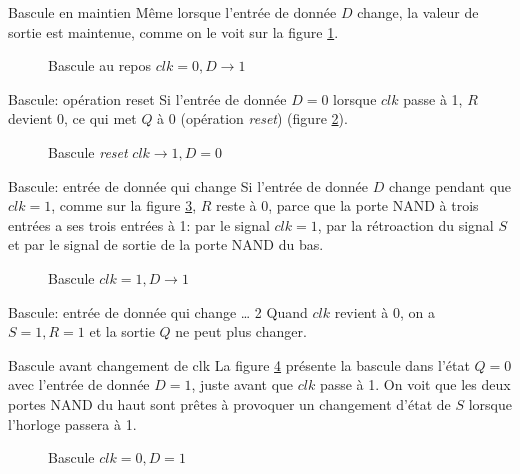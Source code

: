 \documentclass[presentation]{beamer}
\begin{document}
\begin{frame}[label={sec:orgb5165db}]{Bascule en maintien}
Même lorsque l'entrée de donnée \(D\) change, la valeur de sortie est
maintenue, comme on le voit sur la figure \ref{fig:org60880c1}.

\begin{figure}[htbp]
\centering

\caption{\label{fig:org60880c1}Bascule au repos  \(clk = 0, D \rightarrow 1\)}
\end{figure}
\end{frame}

\begin{frame}[label={sec:org6b2a0d5}]{Bascule: opération reset}
Si l'entrée de donnée \(D = 0\) lorsque \(clk\) passe à 1, \(R\)
devient 0, ce qui met \(Q\) à 0 (opération \emph{reset}) (figure
\ref{fig:org07d2ee8}).

\begin{figure}[htbp]
\centering

\caption{\label{fig:org07d2ee8}Bascule  \emph{reset} \(clk \rightarrow 1, D=0\)}
\end{figure}
\end{frame}

\begin{frame}[label={sec:org631db72}]{Bascule: entrée de donnée qui change}
Si l'entrée de donnée \(D\) change pendant que \(clk = 1\), comme sur
la figure \ref{fig:org7be21c1}, \(R\) reste à 0, parce que la porte NAND à
trois entrées a ses trois entrées à 1: par le signal \(clk = 1\), par
la rétroaction du signal \(S\) et par le signal de sortie de la porte
NAND du bas.

\begin{figure}[htbp]
\centering

\caption{\label{fig:org7be21c1}Bascule   \(clk = 1, D \rightarrow 1\)}
\end{figure}
\end{frame}

\begin{frame}[label={sec:orgc4277d5}]{Bascule: entrée de donnée qui change \ldots{} 2}
Quand \(clk\) revient à 0, on a \(S= 1, R=1\) et la sortie \(Q\) ne
peut plus changer.
\end{frame}

\begin{frame}[label={sec:orgd3e03fb}]{Bascule avant changement de clk}
La figure \ref{fig:orgd901f2f} présente la bascule dans l'état \(Q=0\)
avec l'entrée de donnée \(D = 1\), juste avant que \(clk\) passe
à 1. On voit que les deux portes NAND du haut sont prêtes à provoquer
un changement d'état de \(S\) lorsque l'horloge passera à 1.

\begin{figure}[htbp]
\centering

\caption{\label{fig:orgd901f2f}Bascule   \(clk =0, D = 1\)}
\end{figure}
\end{frame}
\end{document}

